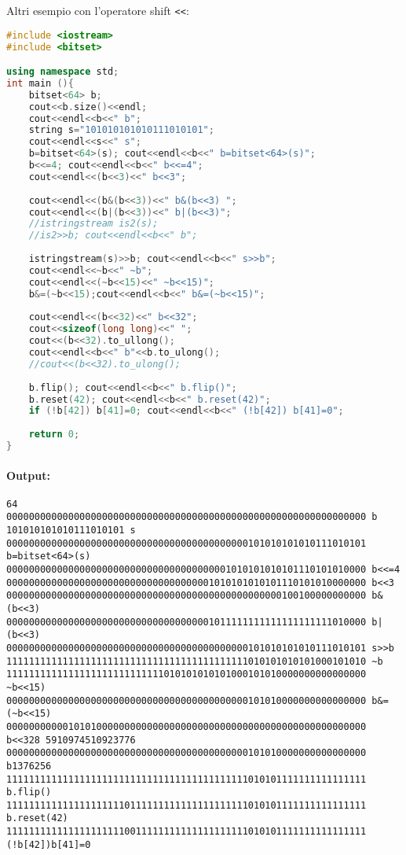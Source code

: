 Altri esempio con l'operatore shift \verb|<<|:

\begin{lstlisting}[language=C++]
#include <iostream>
#include <bitset> 

using namespace std;
int main (){
    bitset<64> b;
    cout<<b.size()<<endl;
    cout<<endl<<b<<" b";
    string s="101010101010111010101";
    cout<<endl<<s<<" s";
    b=bitset<64>(s); cout<<endl<<b<<" b=bitset<64>(s)";
    b<<=4; cout<<endl<<b<<" b<<=4";
    cout<<endl<<(b<<3)<<" b<<3";
    
    cout<<endl<<(b&(b<<3))<<" b&(b<<3) ";
    cout<<endl<<(b|(b<<3))<<" b|(b<<3)";
    //istringstream is2(s);
    //is2>>b; cout<<endl<<b<<" b";
    
    istringstream(s)>>b; cout<<endl<<b<<" s>>b";
    cout<<endl<<~b<<" ~b";
    cout<<endl<<(~b<<15)<<" ~b<<15)";
    b&=(~b<<15);cout<<endl<<b<<" b&=(~b<<15)";
    
    cout<<endl<<(b<<32)<<" b<<32";
    cout<<sizeof(long long)<<" ";
    cout<<(b<<32).to_ullong();
    cout<<endl<<b<<" b"<<b.to_ulong();
    //cout<<(b<<32).to_ulong();
    
    b.flip(); cout<<endl<<b<<" b.flip()";
    b.reset(42); cout<<endl<<b<<" b.reset(42)";
    if (!b[42]) b[41]=0; cout<<endl<<b<<" (!b[42]) b[41]=0"; 
    
    return 0;
}
\end{lstlisting}

\paragraph{Output:}

\begin{verbatim}
64
0000000000000000000000000000000000000000000000000000000000000000 b
101010101010111010101 s
0000000000000000000000000000000000000000000101010101010111010101 b=bitset<64>(s)
0000000000000000000000000000000000000001010101010101110101010000 b<<=4
0000000000000000000000000000000000001010101010101110101010000000 b<<3
0000000000000000000000000000000000000000000000000100100000000000 b&(b<<3)
0000000000000000000000000000000000001011111111111111111111010000 b|(b<<3)
0000000000000000000000000000000000000000000101010101010111010101 s>>b
1111111111111111111111111111111111111111111010101010101000101010 ~b
1111111111111111111111111111010101010101000101010000000000000000 ~b<<15)
0000000000000000000000000000000000000000000101010000000000000000 b&=(~b<<15)
0000000000010101000000000000000000000000000000000000000000000000 b<<328 5910974510923776
0000000000000000000000000000000000000000000101010000000000000000 b1376256
1111111111111111111111111111111111111111111010101111111111111111 b.flip()
1111111111111111111110111111111111111111111010101111111111111111 b.reset(42)
1111111111111111111110011111111111111111111010101111111111111111 (!b[42])b[41]=0

\end{verbatim}

